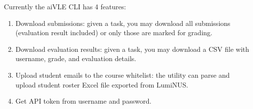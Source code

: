 Currently the aiVLE CLI has 4 features:

\begin{enumerate}
    \item Download submissions: given a task, you may download all submissions (evaluation result included) or only those are marked for grading.
    \item Download evaluation results: given a task, you may download a CSV file with username, grade, and evaluation details.
    \item Upload student emails to the course whitelist: the utility can parse and upload student roster Excel file exported from LumiNUS.
    \item Get API token from username and password.
\end{enumerate}
